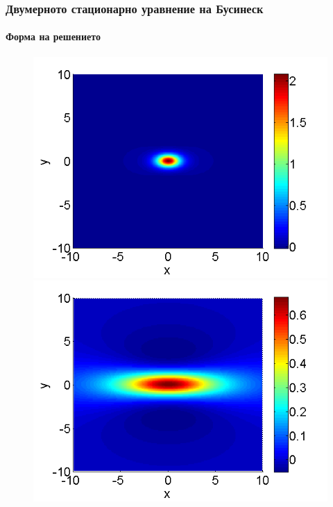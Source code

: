\documentclass{beamer}
\begin{document}
\begin{frame}
\frametitle{Двумерното стационарно уравнение на Бусинеск}
\framesubtitle{Форма на решението}
\begin{figure}[ht]
	\begin{minipage}[b]{0.45\linewidth}
		\raggedleft
		\includegraphics[width=\linewidth]{../Thesis/SolutionView/ChristovIC_30_bt3_c045_topview.png}
	\end{minipage}
	\begin{minipage}[b]{0.45\linewidth}
		\raggedright
		\includegraphics[width=\linewidth]{../Thesis/SolutionView/ChristovIC_128_bt1_c090_topview.png}
	\end{minipage}

\end{figure}
\end{frame}
\end{document}
